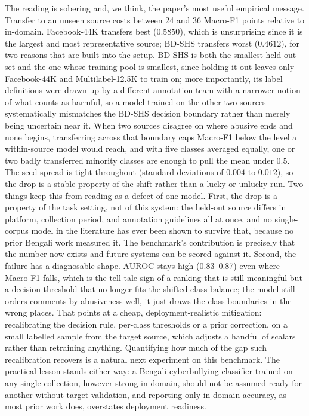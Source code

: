 \documentclass[11pt,a4paper]{article}
\def\emph#1{#1}%
\begin{document}
The reading is sobering and, we think, the paper's most useful empirical message. Transfer to an unseen source costs between 24 and 36 Macro-F1 points relative to in-domain. Facebook-44K transfers best ($0.5850$), which is unsurprising since it is the largest and most representative source; BD-SHS transfers worst ($0.4612$), for two reasons that are built into the setup. BD-SHS is both the smallest held-out set and the one whose training pool is smallest, since holding it out leaves only Facebook-44K and Multilabel-12.5K to train on; more importantly, its label definitions were drawn up by a different annotation team with a narrower notion of what counts as harmful, so a model trained on the other two sources systematically mismatches the BD-SHS decision boundary rather than merely being uncertain near it. When two sources disagree on where \emph{abusive} ends and \emph{none} begins, transferring across that boundary caps Macro-F1 below the level a within-source model would reach, and with five classes averaged equally, one or two badly transferred minority classes are enough to pull the mean under $0.5$. The seed spread is tight throughout (standard deviations of $0.004$ to $0.012$), so the drop is a stable property of the shift rather than a lucky or unlucky run. Two things keep this from reading as a defect of one model. First, the drop is a property of the task setting, not of this system: the held-out source differs in platform, collection period, and annotation guidelines all at once, and no single-corpus model in the literature has ever been shown to survive that, because no prior Bengali work measured it. The benchmark's contribution is precisely that the number now exists and future systems can be scored against it. Second, the failure has a diagnosable shape. AUROC stays high (0.83--0.87) even where Macro-F1 falls, which is the tell-tale sign of a ranking that is still meaningful but a decision threshold that no longer fits the shifted class balance; the model still orders comments by abusiveness well, it just draws the class boundaries in the wrong places. That points at a cheap, deployment-realistic mitigation: recalibrating the decision rule, per-class thresholds or a prior correction, on a small labelled sample from the target source, which adjusts a handful of scalars rather than retraining anything. Quantifying how much of the gap such recalibration recovers is a natural next experiment on this benchmark. The practical lesson stands either way: a Bengali cyberbullying classifier trained on any single collection, however strong in-domain, should not be assumed ready for another without target validation, and reporting only in-domain accuracy, as most prior work does, overstates deployment readiness.
\end{document}
